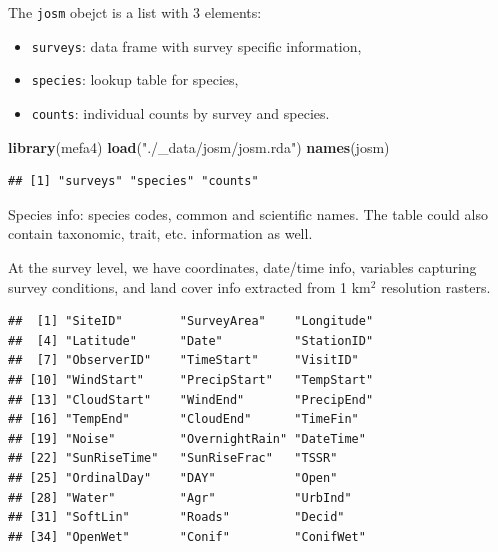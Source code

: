 \documentclass[12pt,]{book}
\newenvironment{Shaded}{\begin{snugshade}}{\end{snugshade}}
\newcommand{\KeywordTok}[1]{\textcolor[rgb]{0.13,0.29,0.53}{\textbf{#1}}}
\newcommand{\NormalTok}[1]{#1}
\newcommand{\OperatorTok}[1]{\textcolor[rgb]{0.81,0.36,0.00}{\textbf{#1}}}
\newcommand{\StringTok}[1]{\textcolor[rgb]{0.31,0.60,0.02}{#1}}
\providecommand{\tightlist}{%
  \setlength{\itemsep}{0pt}\setlength{\parskip}{0pt}}
\begin{document}
The \texttt{josm} obejct is a list with 3 elements:

\begin{itemize}
\tightlist
\item
  \texttt{surveys}: data frame with survey specific information,
\item
  \texttt{species}: lookup table for species,
\item
  \texttt{counts}: individual counts by survey and species.
\end{itemize}

\begin{Shaded}
\begin{Highlighting}[]
\KeywordTok{library}\NormalTok{(mefa4)}
\KeywordTok{load}\NormalTok{(}\StringTok{"./_data/josm/josm.rda"}\NormalTok{)}
\KeywordTok{names}\NormalTok{(josm)}
\end{Highlighting}
\end{Shaded}

\begin{verbatim}
## [1] "surveys" "species" "counts"
\end{verbatim}

Species info: species codes, common and scientific names. The table could also contain
taxonomic, trait, etc. information as well.

\begin{Shaded}
\end{Shaded}

At the survey level, we have coordinates, date/time info,
variables capturing survey conditions, and land cover info extracted from 1 km\(^2\) resolution rasters.

\begin{Shaded}
\end{Shaded}

\begin{verbatim}
##  [1] "SiteID"        "SurveyArea"    "Longitude"    
##  [4] "Latitude"      "Date"          "StationID"    
##  [7] "ObserverID"    "TimeStart"     "VisitID"      
## [10] "WindStart"     "PrecipStart"   "TempStart"    
## [13] "CloudStart"    "WindEnd"       "PrecipEnd"    
## [16] "TempEnd"       "CloudEnd"      "TimeFin"      
## [19] "Noise"         "OvernightRain" "DateTime"     
## [22] "SunRiseTime"   "SunRiseFrac"   "TSSR"         
## [25] "OrdinalDay"    "DAY"           "Open"         
## [28] "Water"         "Agr"           "UrbInd"       
## [31] "SoftLin"       "Roads"         "Decid"        
## [34] "OpenWet"       "Conif"         "ConifWet"
\end{verbatim}
\end{document}
